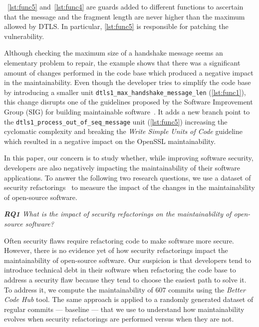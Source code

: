 \documentclass[sigconf,review]{acmart}
\begin{document}
~\ref{lst:func5} and~\ref{lst:func4} are guards added to different functions to
ascertain that the message and the fragment length are never higher than the
maximum allowed by DTLS. In particular, \ref{lst:func5} is responsible for patching
the vulnerability.

Although checking the maximum size of a handshake message seems an elementary
problem to repair, the example shows that there was a significant amount of
changes performed in the code base which produced a negative impact in the
maintainability. Even though the developer tries to simplify the
code base by introducing a smaller unit
\texttt{dtls1\_max\_handshake\_message\_len} (\ref{lst:func1}), this change disrupts
one of the guidelines proposed by the Software Improvement Group (SIG) for
building maintainable software~\cite{Visser:2016:OREILLY}. It adds a new branch
point to the \texttt{dtls1\_process\_out\_of\_seq\_message} unit
(\ref{lst:func5}) increasing the cyclomatic complexity and breaking the
\emph{Write Simple Units of Code} guideline which resulted in a negative impact on the
OpenSSL maintainability.

In this paper, our concern is to study whether, while improving software
security, developers are also negatively impacting the maintainability of their
software applications. To answer the following two research questions, we use a
dataset of security refactorings~\cite{Reis:2017:IJSSE} to measure the impact of
the changes in the maintainability of open-source software.

\begin{framed}
\textit{\textbf{RQ1} What is the impact of security refactorings on the
maintainability of open-source software?}
\end{framed}
\vspace{-0.1cm}

Often security flaws require refactoring code to make software more secure.
However, there is no evidence yet of how security refactorings impact the
maintainability of open-source software. Our suspicion is that developers tend
to introduce technical debt in their software when refactoring the code base to
address a security flaw because they tend to choose the easiest path to solve
it. To address it, we compute the maintainability of $607$ commits using the
\emph{Better Code Hub} tool. The same approach is applied to a randomly generated
dataset of regular commits --- baseline --- that we use to understand how
maintainability evolves when security refactorings are performed versus when
they are not.
\end{document}
